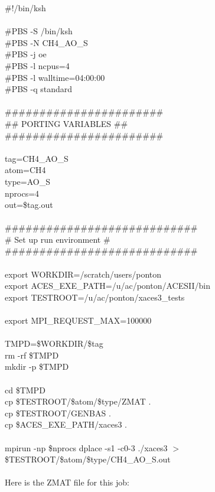 \documentclass[12pt]{article}
\begin{document}
\noindent 
\#!/bin/ksh\\ 
\\
\#PBS -S /bin/ksh\\ 
\#PBS -N CH4\_AO\_S\\ 
\#PBS -j oe\\ 
\#PBS -l ncpus=4\\ 
\#PBS -l walltime=04:00:00\\ 
\#PBS -q standard\\ 
\\
\#\#\#\#\#\#\#\#\#\#\#\#\#\#\#\#\#\#\#\#\#\#\#\\
\#\# PORTING VARIABLES \#\#\\ 
\#\#\#\#\#\#\#\#\#\#\#\#\#\#\#\#\#\#\#\#\#\#\#\\ 
\\
tag=CH4\_AO\_S\\
atom=CH4\\ 
type=AO\_S\\ 
nprocs=4\\ 
out=\$tag.out\\ 
\\ 
\#\#\#\#\#\#\#\#\#\#\#\#\#\#\#\#\#\#\#\#\#\#\#\#\#\#\#\#\\
\#   Set up run environment \#\\
\#\#\#\#\#\#\#\#\#\#\#\#\#\#\#\#\#\#\#\#\#\#\#\#\#\#\#\#\\
\\ 
export WORKDIR=/scratch/users/ponton\\ 
export ACES\_EXE\_PATH=/u/ac/ponton/ACESII/bin\\ 
export TESTROOT=/u/ac/ponton/xaces3\_tests\\ 
\\
export MPI\_REQUEST\_MAX=100000\\ 
\\
TMPD=\$WORKDIR/\$tag\\ 
rm -rf \$TMPD\\ 
mkdir -p \$TMPD\\ 
\\
cd \$TMPD\\ 
cp \$TESTROOT/\$atom/\$type/ZMAT .\\ 
cp \$TESTROOT/GENBAS .\\ 
cp \$ACES\_EXE\_PATH/xaces3 .\\ 
\\ 
mpirun -np \$nprocs dplace -s1 -c0-3 ./xaces3  $>$\$TESTROOT/\$atom/\$type/CH4\_AO\_S.out\\ 
\\ 
Here is the ZMAT file for this job:\\ 
\end{document}
